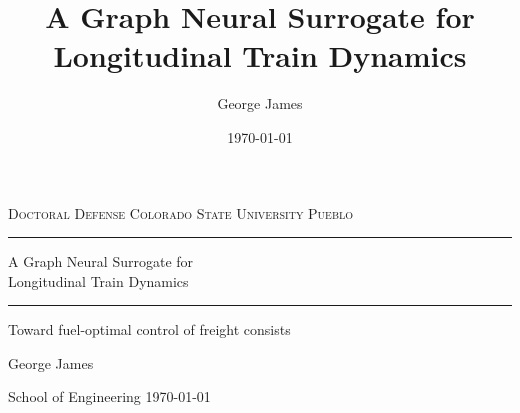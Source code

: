 \documentclass[aspectratio=169,11pt]{beamer}
\title{A Graph Neural Surrogate for Longitudinal Train Dynamics}
\author{George James}
\date{\today}
\begin{document}
{%
\begin{frame}[plain]
  \vspace{1.1em}
  \hspace{0.055\paperwidth}%
  \begin{minipage}{0.86\paperwidth}
    {\color{edSteel}\footnotesize\textsc{Doctoral Defense}\hfill
     \textsc{Colorado State University Pueblo}}\\[0.35em]
    {\color{edSteel!45}\rule{\linewidth}{0.5pt}}

    \vspace{1.5em}
    {\color{edPaper}\fontsize{22}{26}\selectfont
     A Graph Neural Surrogate for\\[0.15em]
     Longitudinal Train Dynamics\par}

    \vspace{0.7em}
    {\color{edAmber}\rule{3.2em}{1.6pt}}

    \vspace{0.7em}
    {\color{edSteel}\normalsize Toward fuel-optimal control of freight consists\par}

    \vspace{1.7em}
    {\color{edPaper}\normalsize George James\par}
    {\color{edSteel}\footnotesize School of Engineering \quad\textbullet\quad \today\par}
  \end{minipage}
\end{frame}
}
\end{document}
